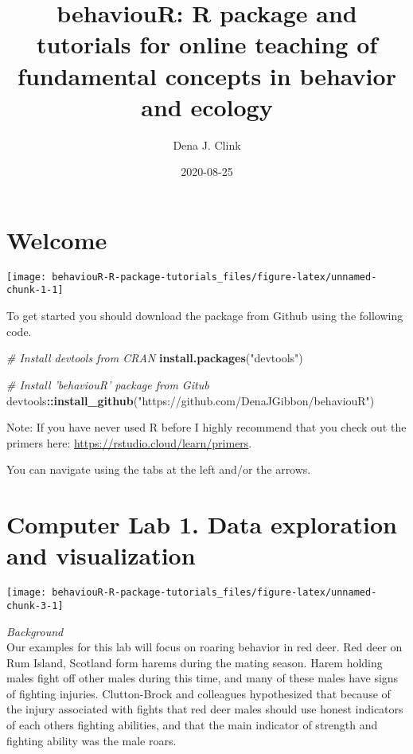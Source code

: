\documentclass[]{book}
\title{behaviouR: R package and tutorials for online teaching of fundamental concepts in behavior and ecology}
\author{Dena J. Clink}
\date{2020-08-25}
\newenvironment{Shaded}{\begin{snugshade}}{\end{snugshade}}
\newcommand{\CommentTok}[1]{\textcolor[rgb]{0.56,0.35,0.01}{\textit{#1}}}
\newcommand{\KeywordTok}[1]{\textcolor[rgb]{0.13,0.29,0.53}{\textbf{#1}}}
\newcommand{\NormalTok}[1]{#1}
\newcommand{\OperatorTok}[1]{\textcolor[rgb]{0.81,0.36,0.00}{\textbf{#1}}}
\newcommand{\StringTok}[1]{\textcolor[rgb]{0.31,0.60,0.02}{#1}}
\begin{document}
\maketitle

{
\setcounter{tocdepth}{1}
\tableofcontents
}
\hypertarget{welcome}{%
\chapter*{Welcome}\label{welcome}}

\begin{center}\texttt{[image: behaviouR-R-package-tutorials\_files/figure-latex/unnamed-chunk-1-1]} \end{center}

To get started you should download the package from Github using the following code.

\begin{Shaded}
\begin{Highlighting}[]
\CommentTok{# Install devtools from CRAN}
\KeywordTok{install.packages}\NormalTok{(}\StringTok{"devtools"}\NormalTok{)}

\CommentTok{# Install 'behaviouR' package from Gitub}
\NormalTok{devtools}\OperatorTok{::}\KeywordTok{install_github}\NormalTok{(}\StringTok{"https://github.com/DenaJGibbon/behaviouR"}\NormalTok{)}
\end{Highlighting}
\end{Shaded}

Note: If you have never used R before I highly recommend that you check out the primers here: \url{https://rstudio.cloud/learn/primers}.

You can navigate using the tabs at the left and/or the arrows.

\hypertarget{computer-lab-1.-data-exploration-and-visualization}{%
\chapter*{Computer Lab 1. Data exploration and visualization}\label{computer-lab-1.-data-exploration-and-visualization}}

\begin{center}\texttt{[image: behaviouR-R-package-tutorials\_files/figure-latex/unnamed-chunk-3-1]} \end{center}

\emph{Background}\\
Our examples for this lab will focus on roaring behavior in red deer. Red deer on Rum Island, Scotland form harems during the mating season. Harem holding males fight off other males during this time, and many of these males have signs of fighting injuries. Clutton-Brock and colleagues hypothesized that because of the injury associated with fights that red deer males should use honest indicators of each others fighting abilities, and that the main indicator of strength and fighting ability was the male roars.
\end{document}
